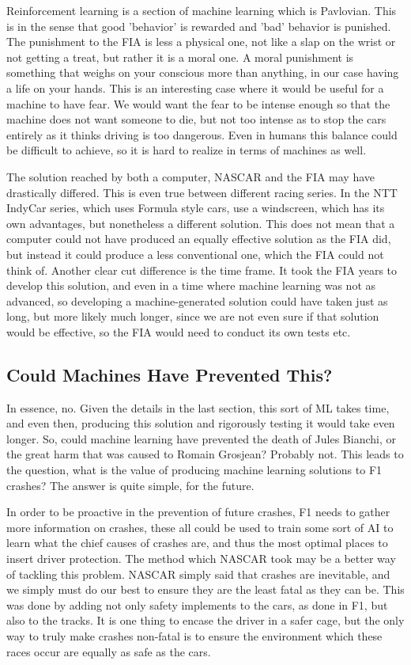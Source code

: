 \documentclass[letterpaper, 12pt]{article}
\numberwithin{figure}{section}
\begin{document}
Reinforcement learning is a section of machine learning which is Pavlovian. This is in the sense that good 'behavior' is rewarded and 'bad' behavior is punished. The punishment to the FIA is less a physical one, not like a slap on the wrist or not getting a treat, but rather it is a moral one. A moral punishment is something that weighs on your conscious more than anything, in our case having a life on your hands. This is an interesting case where it would be useful for a machine to have fear. We would want the fear to be intense enough so that the machine does not want someone to die, but not too intense as to stop the cars entirely as it thinks driving is too dangerous. Even in humans this balance could be difficult to achieve, so it is hard to realize in terms of machines as well.

The solution reached by both a computer, NASCAR and the  FIA may have drastically differed. This is even true between different racing series. In the NTT IndyCar series, which uses Formula style cars, use a windscreen, which has its own advantages, but nonetheless a different solution. This does not mean that a computer could not have produced an equally effective solution as the FIA did, but instead it could produce a less conventional one, which the FIA could not think of. Another clear cut difference is the time frame. It took the FIA years to develop this solution, and even in a time where machine learning was not as advanced, so developing a machine-generated solution could have taken just as long, but more likely much longer, since we are not even sure if that solution would be effective, so the FIA would need to conduct its own tests etc.

\subsection{Could Machines Have Prevented This?}
In essence, no. Given the details in the last section, this sort of ML takes time, and even then, producing this solution and rigorously testing it would take even longer. So, could machine learning have prevented the death of Jules Bianchi, or the great harm that was caused to Romain Grosjean? Probably not. This leads to the question, what is the value of producing machine learning solutions to F1 crashes? The answer is quite simple, for the future.

In order to be proactive in the prevention of future crashes, F1 needs to gather more information on crashes, these all could be used to train some sort of AI to learn what the chief causes of crashes are, and thus the most optimal places to insert driver protection. The method which NASCAR took may be a better way of tackling this problem. NASCAR simply said that crashes are inevitable, and we simply must do our best to ensure they are the least fatal as they can be. This was done by adding not only safety implements to the cars, as done in F1, but also to the tracks. It is one thing to encase the driver in a safer cage, but the only way to truly make crashes non-fatal is to ensure the environment which these races occur are equally as safe as the cars.
\end{document}
